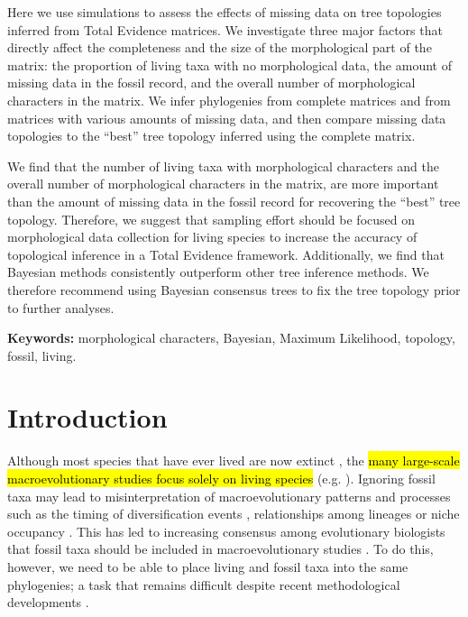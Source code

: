 \documentclass[12pt,letterpaper]{article}
\begin{document}
Here we use simulations to assess the effects of missing data on tree topologies inferred from Total Evidence matrices.
We investigate three major factors that directly affect the completeness and the size of the morphological part of the matrix: the proportion of living taxa with no morphological data, the amount of missing data in the fossil record, and the overall number of morphological characters in the matrix.
We infer phylogenies from complete matrices and from matrices with various amounts of missing data, and then compare missing data topologies to the ``best'' tree topology inferred using the complete matrix.

We find that the number of living taxa with morphological characters and the overall number of morphological characters in the matrix, are more important than the amount of missing data in the fossil record for recovering the ``best'' tree topology.
Therefore, we suggest that sampling effort should be focused on morphological data collection for living species to increase the accuracy of topological inference in a Total Evidence framework.
Additionally, we find that Bayesian methods consistently outperform other tree inference methods.
We therefore recommend using Bayesian consensus trees to fix the tree topology prior to further analyses.

\bigskip
\noindent
\textbf{Keywords:} morphological characters, Bayesian, Maximum Likelihood, topology, fossil, living.

%
%

\newpage
\section{Introduction}
Although most species that have ever lived are now extinct \citep{novacek1992ext,raup1993extinction}, the \hl{many large-scale macroevolutionary studies focus solely on living species} (e.g. \citealp{meredithimpacts2011,jetzthe2012}).
Ignoring fossil taxa may lead to misinterpretation of macroevolutionary patterns and processes such as the timing of diversification events \citep[e.g.][]{pyrondivergence2011}, relationships among lineages \citep[e.g.][]{manosphylogeny2007} or niche occupancy \citep[e.g.][]{pearmanniche2008}.
This has led to increasing consensus among evolutionary biologists that fossil taxa should be included in macroevolutionary studies \citep{jacksonwhat2006,quentaldiversity2010,dietlconservation2011,slaterunifying2013,fritzdiversity2013}.
To do this, however, we need to be able to place living and fossil taxa into the same phylogenies; a task that remains difficult despite recent methodological developments \citep[e.g.][]{pyrondivergence2011,ronquista2012,BEASTmaster}.
\end{document}
